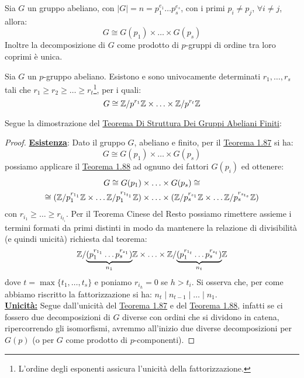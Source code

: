 \documentclass[11pt]{scrartcl}
\begin{document}
\begin{theorem}
    \label{t:t1}
    Sia $G$ un gruppo abeliano, con $|G| = n = p_1^{e_1}\ldots p_s^{e_s}$, con i primi $p_i \ne p_j$, $\forall i \ne j$, allora:
        \[ G \cong G(p_1) \times \ldots \times G(p_s)
            \]
    Inoltre la decomposizione di $G$ come prodotto di $p$-gruppi di ordine tra loro coprimi è unica.
\end{theorem}

\begin{theorem}
    \label{t:t2}
    Sia $G$ un $p$-gruppo abeliano. Esistono e sono univocamente determinati $r_1,\ldots,r_s$ tali che $r_1 \geq r_2 \geq \ldots \geq r_t$\footnote{L'ordine
     degli esponenti assicura l'unicità della fattorizzazione.}, per i quali:
        \[ G \cong \mathbb{Z}/{p^{r_1}}\mathbb{Z} \times \ldots \times \mathbb{Z}/{p^{r_t}}\mathbb{Z}
            \]
\end{theorem}

\pagebreak

Segue la dimostrazione del \hyperref[t:struttura]{Teorema Di Struttura Dei Gruppi Abeliani Finiti}:

\begin{proof}
    \underline{\textbf{Esistenza}}: Dato il gruppo $G$, abeliano e finito, per il \hyperref[t:t1]{Teorema 1.87} si ha:
        \[ G \cong G(p_1) \times \ldots \times G(p_s)
            \]
    possiamo applicare il \hyperref[t:t2]{Teorema 1.88} ad ognuno dei fattori $G(p_i)$ ed ottenere:
        \begin{multline*}
            G \cong G(p_1) \times \ldots \times G(p_s) \cong \\
            \cong (\mathbb{Z}/{p_1^{r_{1_1}}}\mathbb{Z} \times \ldots \mathbb{Z}/{p_1^{r_{1_{t_1}}}}\mathbb{Z}) \times \ldots \times (\mathbb{Z}/{p_s^{r_{s_1}}}\mathbb{Z} \times \ldots \mathbb{Z}/{p_s^{r_{s_{t_s}}}}\mathbb{Z})
        \end{multline*}
    con $r_{i_1} \geq \ldots \geq r_{i_{t_i}}$. Per il Teorema Cinese del Resto possiamo rimettere assieme i termini formati da primi distinti in modo da mantenere la relazione di divisibilità (e quindi unicità)
    richiesta dal teorema:
    \[ \mathbb{Z}/{\underbrace{(p_1^{r_{1_1}}\ldots p_s^{r_{s_1}})}_{n_1}}\mathbb{Z} \times \ldots \times \mathbb{Z}/{\underbrace{(p_1^{r_{1_t}}\ldots p_s^{r_{s_t}})}_{n_t}}\mathbb{Z}
        \]
    dove $t = \max\{t_1,\ldots,t_s\}$ e poniamo $r_{i_h} = 0$ se $h>t_i$. Si osserva che, per come abbiamo riscritto la fattorizzazione si ha: $n_t \mid n_{t-1} \mid \ldots \mid n_1$.\\
    \underline{\textbf{Unicità:}} Segue dall'unicità del \hyperref[t:t1]{Teorema 1.87} e del \hyperref[t:t2]{Teorema 1.88}, infatti se ci fossero due decomposizioni di 
    $G$ diverse con ordini che si dividono in catena, ripercorrendo gli isomorfismi, avremmo all'inizio due diverse decomposizioni per $G(p)$ (o per $G$ come prodotto di $p$-componenti).
\end{proof}
\end{document}
